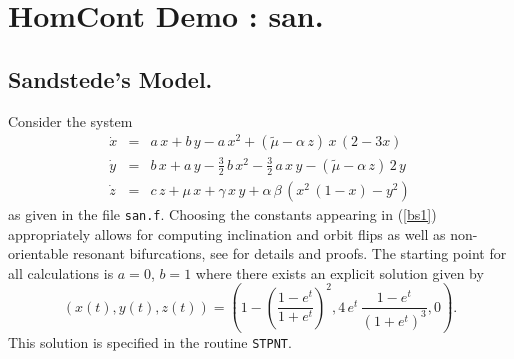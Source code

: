 \documentclass[12pt]{report}
\begin{document}
\chapter{ {\cal HomCont} Demo : san.} \label{ch:HomCont_san}

\section{ Sandstede's Model.}
\newcommand{\ti}{\tilde}
Consider the system \cite{Sa:95b}
\begin{equation} \label{bs1} \begin{array}{rcl}
\dot{x} & = & a \, x + b \, y - a \, x^2 + (\ti \mu - \alpha \, z) \, x
\, (2-3x) \\
\dot{y} & = & b \, x + a \, y - \frac{3}{2} \, b \, x^2 - 
\frac{3}{2} \, a \, x \, y - (\ti \mu - \alpha \, z) \, 2 \, y \\
\dot{z} & = & c \, z + \mu \, x + \gamma\, x\, y + \alpha \, 
\beta \, (x^2 \, (1-x) - y^2)

\end{array} \end{equation}
as given in the file {\tt san.f}.
Choosing the constants appearing
in (\ref{bs1}) appropriately allows for computing inclination and
orbit flips as well as non-orientable resonant bifurcations, see
\cite{Sa:95b} for details and proofs. The starting point for all
calculations is $a=0$, $b=1$ where there exists an explicit solution
given by  
$$ 
(x(t),y(t),z(t)) = 
\left( 1 - \left(\frac{1-e^t}{1+e^t}\right)^2 , 4 \, e^t \,
\frac{1-e^t}{(1+e^t)^3} , 0 \right). 
$$
This solution is specified in the routine {\tt STPNT}.
\end{document}
